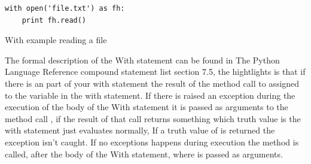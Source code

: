 \begin{listing}[H]
	\begin{verbatim}
with open('file.txt') as fh:
	print fh.read()
	\end{verbatim}
	\caption{With example reading a file}\label{code:withExample}
\end{listing}

The formal description of the With statement can be found in The Python Language Reference compound statement list\cite{pyref.compound} section 7.5, the hightlights is that if there is an  part of your with statement the result of the method call to  assigned to the variable in the with statement. If there is raised an exception during the execution of the body of the With statement it is passed as arguments to the method call , if the result of that call returns something which truth value is  the with statement just evaluates normally, If a truth value of  is returned the exception isn't caught. If no exceptions happens during execution the  method is called, after the body of the With statement, where  is passed as arguments.

